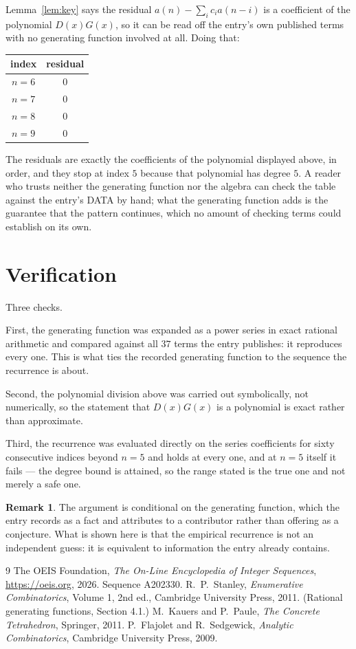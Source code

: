 \documentclass[11pt,a4paper]{article}
\theoremstyle{plain}
\theoremstyle{definition}
\newtheorem{remark}[theorem]{Remark}
\begin{document}
Lemma~\ref{lem:key} says the residual $a(n)-\sum_ic_ia(n-i)$ is a coefficient of the
polynomial $D(x)G(x)$, so it can be read off the entry's own published terms with no
generating function involved at all. Doing that:
\begin{center}
\begin{tabular}{cc}
index & residual \\ \hline
$n=6$ & $0$ \\
$n=7$ & $0$ \\
$n=8$ & $0$ \\
$n=9$ & $0$
\end{tabular}
\end{center}
The residuals are exactly the coefficients of the polynomial displayed above, in order, and
they stop at index $5$ because that polynomial has degree $5$. A reader who trusts
neither the generating function nor the algebra can check the table against the entry's DATA
by hand; what the generating function adds is the guarantee that the pattern continues, which
no amount of checking terms could establish on its own.

\section{Verification}

Three checks.

First, the generating function was expanded as a power series in exact rational arithmetic and
compared against all $37$ terms the entry publishes: it reproduces every one. This is
what ties the recorded generating function to the sequence the recurrence is about.

Second, the polynomial division above was carried out symbolically, not numerically, so the
statement that $D(x)G(x)$ is a polynomial is exact rather than approximate.

Third, the recurrence was evaluated directly on the series coefficients for sixty consecutive
indices beyond $n=5$ and holds at every one, and at $n=5$ itself it fails --- the
degree bound is attained, so the range stated is the true one and not merely a safe one.

\begin{remark}
The argument is conditional on the generating function, which the entry records as a fact and
attributes to a contributor rather than offering as a conjecture. What is shown here is that
the empirical recurrence is not an independent guess: it is equivalent to information the
entry already contains.
\end{remark}

\begin{thebibliography}{9}
 The OEIS Foundation, \emph{The On-Line Encyclopedia of Integer
Sequences}, \url{https://oeis.org}, 2026. Sequence A202330.
 R.~P.~Stanley, \emph{Enumerative Combinatorics}, Volume 1, 2nd ed.,
Cambridge University Press, 2011. (Rational generating functions, Section 4.1.)
 M.~Kauers and P.~Paule, \emph{The Concrete Tetrahedron}, Springer, 2011.
 P.~Flajolet and R.~Sedgewick, \emph{Analytic Combinatorics}, Cambridge
University Press, 2009.
\end{thebibliography}
\end{document}
